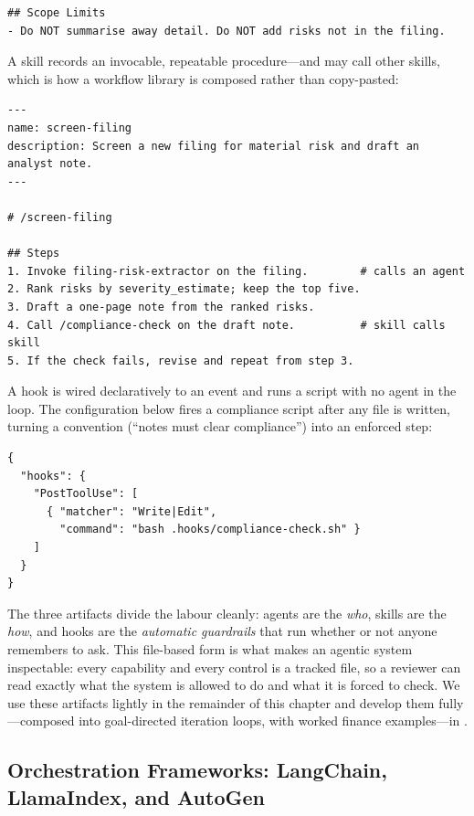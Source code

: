 \begin{deepdive}
\begin{verbatim}
## Scope Limits
- Do NOT summarise away detail. Do NOT add risks not in the filing.
\end{verbatim}

A skill records an invocable, repeatable procedure---and may call other skills, which is
how a workflow library is composed rather than copy-pasted:

\begin{verbatim}
---
name: screen-filing
description: Screen a new filing for material risk and draft an analyst note.
---

# /screen-filing

## Steps
1. Invoke filing-risk-extractor on the filing.        # calls an agent
2. Rank risks by severity_estimate; keep the top five.
3. Draft a one-page note from the ranked risks.
4. Call /compliance-check on the draft note.          # skill calls skill
5. If the check fails, revise and repeat from step 3.
\end{verbatim}

A hook is wired declaratively to an event and runs a script with no agent in the loop.
The configuration below fires a compliance script after any file is written, turning a
convention (``notes must clear compliance'') into an enforced step:

\begin{verbatim}
{
  "hooks": {
    "PostToolUse": [
      { "matcher": "Write|Edit",
        "command": "bash .hooks/compliance-check.sh" }
    ]
  }
}
\end{verbatim}

The three artifacts divide the labour cleanly: agents are the \emph{who}, skills are the
\emph{how}, and hooks are the \emph{automatic guardrails} that run whether or not anyone
remembers to ask. This file-based form is what makes an agentic system inspectable: every
capability and every control is a tracked file, so a reviewer can read exactly what the
system is allowed to do and what it is forced to check. We use these artifacts lightly in
the remainder of this chapter and develop them fully---composed into goal-directed
iteration loops, with worked finance examples---in
.


\subsection{Orchestration Frameworks: LangChain, LlamaIndex, and AutoGen}
\label{subsec:frameworks}


\end{deepdive}

